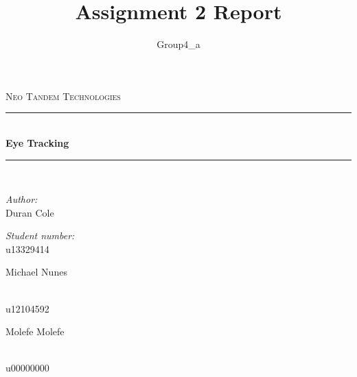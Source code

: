 \documentclass[a4paper,12pt]{report}
\author{Group4_a}
\title{ Assignment 2 Report}
\newcommand{\HRule}{\rule{\linewidth}{0.5mm}}
\begin{document}
\setlength{\parskip}{6pt}

\begin{titlepage}

\begin{center}
\textsc{\LARGE Neo Tandem Technologies}\\[1.5cm]


\HRule \\[0.4cm]
{ \huge \bfseries Eye Tracking}\\[0.4cm]
\HRule \\[0.4cm]
\begin{minipage}{0.4\textwidth}
\begin{flushleft} \large
\emph{Author:}\\
Duran {Cole}
\end{flushleft}
\end{minipage}
\begin{minipage}{0.4\textwidth}
\begin{flushright} \large
\emph{Student number:} \\
u13329414
\end{flushright}
\end{minipage}
\begin{minipage}{0.4\textwidth}
\begin{flushleft} \large
Michael {Nunes}
\end{flushleft}
\end{minipage}
\begin{minipage}{0.4\textwidth}
\begin{flushright} \large
\emph{} \\
u12104592
\end{flushright}
\end{minipage}
\begin{minipage}{0.4\textwidth}
\begin{flushleft} \large
Molefe {Molefe}
\end{flushleft}
\end{minipage}
\begin{minipage}{0.4\textwidth}
\begin{flushright} \large
\emph{} \\
u00000000
\end{flushright}

\end{minipage}
\end{center}
\end{titlepage}
\end{document}
